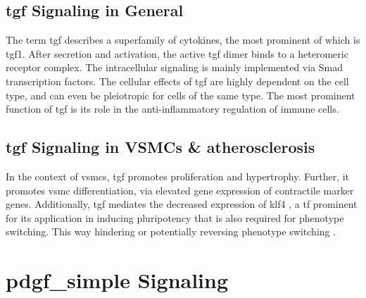     \subsection{\ac{tgf} Signaling in General}
    \label{subsec:tgf_the_cytokine}
    The term \acf{tgf} describes a superfamily of cytokines, the most prominent of which is \ac{tgf}1. After secretion and activation, the active \ac{tgf} dimer binds to a heteromeric receptor complex. The intracellular signaling is mainly implemented via Smad transcription factors. The cellular effects of \ac{tgf} are highly dependent on the cell type, and can even be pleiotropic for cells of the same type. The most prominent function of \ac{tgf} is its role in the anti-inflammatory regulation of immune cells. \cite{goumansTGFvSignalingControl2018, batlleTransformingGrowthFactorv2019}

    \subsection{\ac{tgf} Signaling in VSMCs \& atherosclerosis}
    \label{subsec:pdf_signaling}
    In the context of \acp{vsmc}, \ac{tgf} promotes proliferation and hypertrophy. Further, it promotes \ac{vsmc} differentiation, via elevated gene expression of contractile marker genes. Additionally, \ac{tgf} mediates the decreased expression of \ac{klf4} \cite{davis-dusenberyDownregulationKruppellikeFactor42011}, a \ac{tf} prominent for its application in inducing pluripotency \cite{takahashiInductionPluripotentStem2007} that is also required for phenotype switching. This way hindering \cite{davis-dusenberyDownregulationKruppellikeFactor42011} or potentially reversing phenotype switching \cite{panSingleCellGenomicsReveals2020}.

\section{\ac{pdgf_simple} Signaling}
\label{sec:pdgf}
